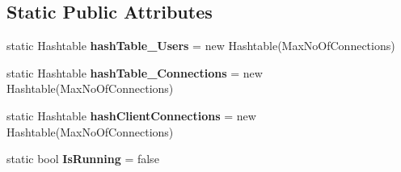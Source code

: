 \subsection*{Static Public Attributes}
\begin{DoxyCompactItemize}
\item 
\hypertarget{class_t_c_p_server_library_1_1_t_c_p_server_a740a528064d20e7408f500df6ad75a00}{
static Hashtable {\bfseries hashTable\_\-Users} = new Hashtable(MaxNoOfConnections)}
\label{class_t_c_p_server_library_1_1_t_c_p_server_a740a528064d20e7408f500df6ad75a00}

\item 
\hypertarget{class_t_c_p_server_library_1_1_t_c_p_server_a315a8ecaa3eed6c57d34cdad56aeae44}{
static Hashtable {\bfseries hashTable\_\-Connections} = new Hashtable(MaxNoOfConnections)}
\label{class_t_c_p_server_library_1_1_t_c_p_server_a315a8ecaa3eed6c57d34cdad56aeae44}

\item 
\hypertarget{class_t_c_p_server_library_1_1_t_c_p_server_a5bdf0d0b679125255e521adced6da3af}{
static Hashtable {\bfseries hashClientConnections} = new Hashtable(MaxNoOfConnections)}
\label{class_t_c_p_server_library_1_1_t_c_p_server_a5bdf0d0b679125255e521adced6da3af}

\item 
\hypertarget{class_t_c_p_server_library_1_1_t_c_p_server_a55ca89afdd28c50035d6e71665707a25}{
static bool {\bfseries IsRunning} = false}
\label{class_t_c_p_server_library_1_1_t_c_p_server_a55ca89afdd28c50035d6e71665707a25}

\end{DoxyCompactItemize}
